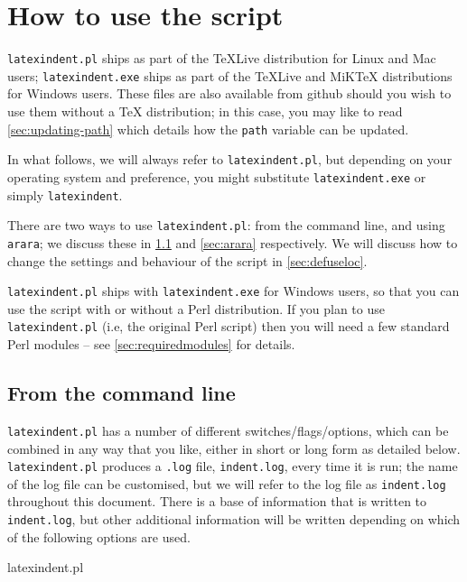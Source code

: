 \section{How to use the script}
 \texttt{latexindent.pl} ships as part of the \TeX Live distribution for
 Linux and Mac users; \texttt{latexindent.exe} ships as part of the \TeX Live
 and MiK\TeX{} distributions for Windows users. These files are also available
 from github \cite{latexindent-home} should you wish to use them without
 a \TeX{} distribution; in this case, you may like to read \vref{sec:updating-path}
 which details how the \texttt{path} variable can be updated.

 In what follows, we will always refer to \texttt{latexindent.pl}, but depending on
 your operating system and preference, you might substitute \texttt{latexindent.exe} or
 simply \texttt{latexindent}.

 There are two ways to use \texttt{latexindent.pl}: from the command line,
 and using \texttt{arara}; we discuss these in \cref{sec:commandline} and
 \cref{sec:arara} respectively. We will discuss how to change the settings and
 behaviour of the script in \vref{sec:defuseloc}.

 \texttt{latexindent.pl} ships with \texttt{latexindent.exe} for Windows
 users, so that you can use the script with or without a Perl distribution.
 If you plan to use \texttt{latexindent.pl} (i.e, the original Perl script) then you will
 need a few standard Perl modules -- see \vref{sec:requiredmodules} for details.

\subsection{From the command line}\label{sec:commandline}
	\texttt{latexindent.pl} has a number of different switches/flags/options, which
	can be combined in any way that you like, either in short or long form as detailed below.
	\texttt{latexindent.pl}  produces a \texttt{.log} file, \texttt{indent.log}, every time it
	is run; the name of the log file can be customised, but we will
	refer to the log file as \texttt{indent.log} throughout this document.
	There is a base of information that is written to \texttt{indent.log},
	but other additional information will be written depending
	on which of the following options are used.

	\begin{commandshell}
latexindent.pl
      \end{commandshell}

